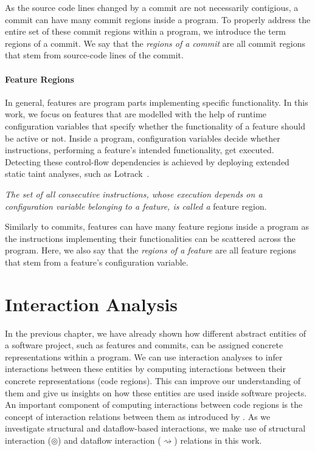 As the source code lines changed by a commit are not necessarily contigious,
a commit can have many commit regions inside a program. 
To properly address the entire set of these commit regions within a program, we introduce the term regions of a commit.
We say that the \emph{regions of a commit} are all commit regions that stem from source-code lines of the commit. 

\paragraph{Feature Regions}\label{sec:feature_regions}

In general, features are program parts implementing specific functionality.
In this work, we focus on features that are modelled with the help of runtime configuration variables that specify whether the functionality of a feature should be active or not.
Inside a program, configuration variables decide whether instructions, performing a feature's intended functionality, get executed. 
Detecting these control-flow dependencies is achieved by deploying extended static taint analyses, such as Lotrack~\cite{lillack2014tracking}.

\begin{definition}\label{def:feature_regions}
	\emph{The set of all consecutive instructions, whose execution depends on a configuration variable belonging to a feature, is called a} feature region. 
\end{definition}

Similarly to commits, features can have many feature regions inside a program
as the instructions implementing their functionalities can be scattered across the program.
Here, we also say that the \emph{regions of a feature} are all feature regions that stem from a feature's configuration variable. 

\section{Interaction Analysis}\label{sec:interaction_analysis}

In the previous chapter, we have already shown how different abstract entities of a software project, such as features and commits, can be assigned concrete representations within a program.
We can use interaction analyses to infer interactions between these entities by computing interactions between their concrete representations (code regions).
This can improve our understanding of them and give us insights on how these entities are used inside software projects. 
An important component of computing interactions between code regions is the concept of interaction relations between them as introduced by \citet{sattler2023seal}.
As we investigate structural and dataflow-based interactions, we make use of structural interaction ($\circledcirc$) and dataflow interaction ($\rightsquigarrow$) relations in this work. 

